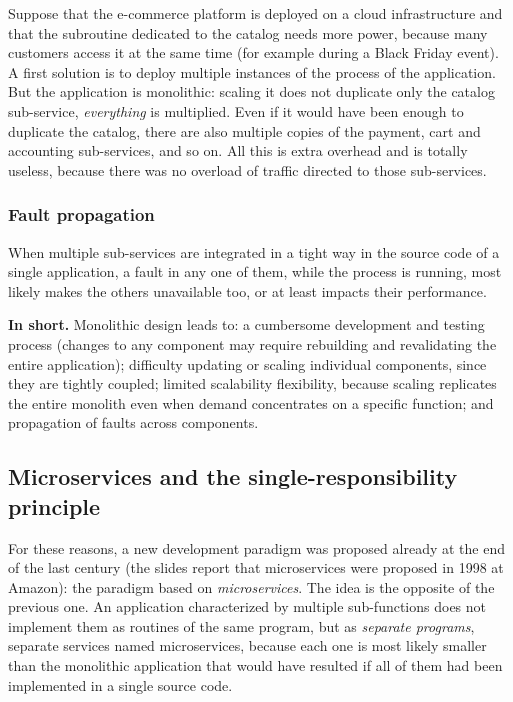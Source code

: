 Suppose that the e-commerce platform is deployed on a cloud infrastructure and that the subroutine dedicated to the catalog needs more power, because many customers access it at the same time (for example during a Black Friday event). A first solution is to deploy multiple instances of the process of the application. But the application is monolithic: scaling it does not duplicate only the catalog sub-service, \emph{everything} is multiplied. Even if it would have been enough to duplicate the catalog, there are also multiple copies of the payment, cart and accounting sub-services, and so on. All this is extra overhead and is totally useless, because there was no overload of traffic directed to those sub-services.

\subsubsection*{Fault propagation}

When multiple sub-services are integrated in a tight way in the source code of a single application, a fault in any one of them, while the process is running, most likely makes the others unavailable too, or at least impacts their performance.

\begin{notebox}
	\textbf{In short.} Monolithic design leads to: a cumbersome development and testing process (changes to any component may require rebuilding and revalidating the entire application); difficulty updating or scaling individual components, since they are tightly coupled; limited scalability flexibility, because scaling replicates the entire monolith even when demand concentrates on a specific function; and propagation of faults across components.
\end{notebox}

\subsection{Microservices and the single-responsibility principle}

For these reasons, a new development paradigm was proposed already at the end of the last century (the slides report that microservices were proposed in 1998 at Amazon): the paradigm based on \emph{microservices}. The idea is the opposite of the previous one. An application characterized by multiple sub-functions does not implement them as routines of the same program, but as \emph{separate programs}, separate services named microservices, because each one is most likely smaller than the monolithic application that would have resulted if all of them had been implemented in a single source code.

